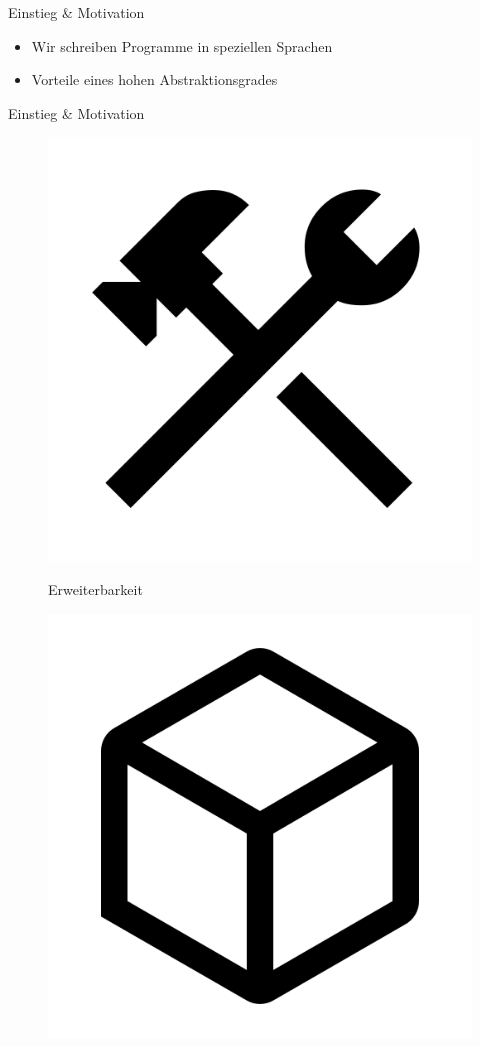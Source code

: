
\begin{frame}{Einstieg \& Motivation}
	\begin{itemize}
		\item Wir schreiben Programme in speziellen Sprachen
		\item Vorteile eines hohen Abstraktionsgrades
	\end{itemize}
\end{frame}

\begin{frame}{Einstieg \& Motivation}
	\begin{figure}[h]
		\begin{minipage}{.32\textwidth}
			\begin{center}
				\centering
				\centerline{\includegraphics[width=.5\textwidth]{assets/google_icon_construction.png}}
				{\small Erweiterbarkeit}
			\end{center}
		\end{minipage}
		\pause
		\hfill
		\begin{minipage}{.32\textwidth}
			\begin{center}
				\centerline{\includegraphics[width=.5\textwidth]{assets/google_icon_deployed_code.png}}

\end{center}
\end{minipage}
\end{figure}
\end{frame}
